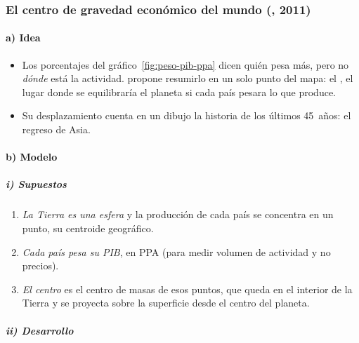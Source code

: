 \documentclass[11pt]{article}
\begin{document}
\subsubsection{El centro de gravedad económico del mundo (, 2011)}\label{sec:centro-gravedad}

\paragraph{a) Idea}

\begin{itemize}
\item Los porcentajes del gráfico~\ref{fig:peso-pib-ppa} dicen quién pesa más, pero no \emph{dónde} está la actividad. \textcite{Quah2011Shifting} propone resumirlo en un solo punto del mapa: el , el lugar donde se equilibraría el planeta si cada país pesara lo que produce.
\item Su desplazamiento cuenta en un dibujo la historia de los últimos 45~años: el regreso de Asia.
\end{itemize}

\paragraph{b) Modelo}

\subparagraph{i) Supuestos}

\begin{enumerate}
\item \emph{La Tierra es una esfera} y la producción de cada país se concentra en un punto, su centroide geográfico.
\item \emph{Cada país pesa su PIB}, en PPA (para medir volumen de actividad y no precios).
\item \emph{El centro} es el centro de masas de esos puntos, que queda en el interior de la Tierra y se proyecta sobre la superficie desde el centro del planeta.
\end{enumerate}

\subparagraph{ii) Desarrollo}
\end{document}

